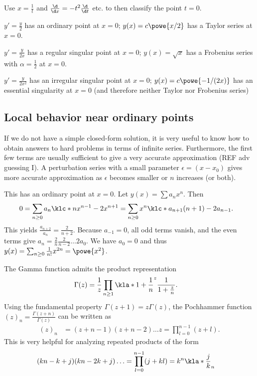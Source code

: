 \documentclass[english, parskip=full]{scrbook}
\newcommand{\definition}[2]{\begin{tcolorbox}[colback=colorbackgrounddefinition,colframe=colordefinition, breakable,enhanced,title=\textbf{#1}.]#2\end{tcolorbox}}
\newcommand{\example}[3]{\begin{tcolorbox}[colback=colorbackgroundexample,colframe=colorexample, breakable,enhanced,title={\textbf{#1}: #2.}]#3\end{tcolorbox}}
\begin{document}
\definition{Classification of $x_0=\infty$}{Use $x=\frac{1}{t}$ and $\frac{\d}{\d x} = -t^2\frac{\d}{\d t}$ etc. to then classify the point $t=0$.
}
\example{First order examples}{near $x=0$}{$y'=\frac{y}{2}$ has an ordinary point at $x=0$; $y(x)=c\powe{x/2}$ has a Taylor series at $x=0$.

$y'=\frac{y}{2x}$ has a regular singular point at $x=0$; $y(x)=\sqrt{x}$ has a Frobenius series with $\alpha=\frac{1}{2}$ at $x=0$.

$y'=\frac{y}{2x^2}$ has an irregular singular point at $x=0$; $y(x)=c\powe{-
1/(2x)}$ has an essential singularity at $x=0$ (and therefore neither Taylor nor Frobenius series)
}
\subsection{Local behavior near ordinary points}
If we do not have a simple closed-form solution, it is very useful to know how to obtain answers to hard problems in terms of infinite series.
Furthermore, the first few terms are usually sufficient to give a very accurate approximation (REF adv guessing I).
A perturbation series with a small parameter $\epsilon=(x-x_0)$ gives more accurate approximation as $\epsilon$ becomes smaller or $n$ increases (or both).
\example{Gauss ODE}{$y'=2xy$ with $y(0)=1$}{This has an ordinary point at $x=0$.
Let $y(x)=\sum a_n x^n$.
Then
\begin{align}
0 &= \sum_{n\ge 0} a_n \klc*{nx^{n-1} - 2x^{n+1}} = \sum_{n\ge 0} x^n \klc*{a_{n+1}(n+1) - 2a_{n-1}}.
\end{align}
This yields $\frac{a_{n+2}}{a_n} = \frac{2}{n+2}$.
Because $a_{-1}=0$, all odd terms vanish, and the even terms give $a_n=\frac{2}{n} \frac{2}{n-2} \dots 2a_0$.
We have $a_0=0$ and thus $y(x)=\sum_{n\ge 0} \frac{1}{n!}x^{2n} = \powe{x^2}$.
}
\definition{Gamma Function}{The Gamma function admits the product representation
\begin{align}
\Gamma(z) &= \frac{1}{z} \prod_{n\ge 1} \kla*{1 + \frac{1}{n}}^z \frac{1}{1+\frac{z}{n}}.
\end{align}
Using the fundamental property $\Gamma(z+1)=z\Gamma(z)$, the Pochhammer function $(z)_n = \frac{\Gamma(z+n)}{\Gamma(z)}$ can be written as
\begin{align}
(z)_n &= (z+n-1)(z+n-2) \dots z = \prod_{l=0}^{n-1} (z+l).
\end{align}
This is very helpful for analyzing repeated products of the form
\begin{align}
(kn-k+j)(kn-2k+j)\dots &= \prod_{l=0}^{n-1} (j+kl) = k^n \kla*{\frac{j}{k}}_n
\end{align}
}
\end{document}
